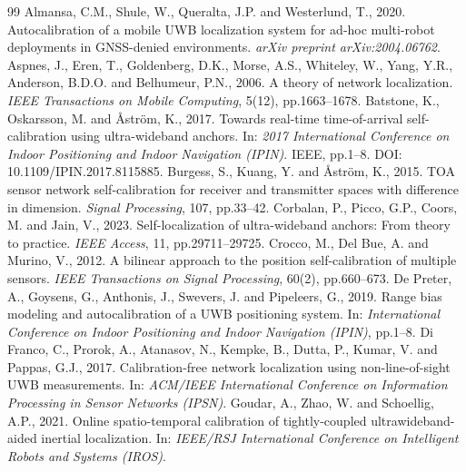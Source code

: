 \documentclass[11pt,a4paper]{article}
\begin{document}
\begin{thebibliography}{99}
 Almansa, C.M., Shule, W., Queralta, J.P. and Westerlund, T., 2020. Autocalibration of a mobile UWB localization system for ad-hoc multi-robot deployments in GNSS-denied environments. \emph{arXiv preprint arXiv:2004.06762}.
 Aspnes, J., Eren, T., Goldenberg, D.K., Morse, A.S., Whiteley, W., Yang, Y.R., Anderson, B.D.O. and Belhumeur, P.N., 2006. A theory of network localization. \emph{IEEE Transactions on Mobile Computing}, 5(12), pp.1663--1678.
 Batstone, K., Oskarsson, M. and \AA{}str\"om, K., 2017. Towards real-time time-of-arrival self-calibration using ultra-wideband anchors. In: \emph{2017 International Conference on Indoor Positioning and Indoor Navigation (IPIN)}. IEEE, pp.1--8. DOI: 10.1109/IPIN.2017.8115885.
 Burgess, S., Kuang, Y. and \AA{}str\"om, K., 2015. TOA sensor network self-calibration for receiver and transmitter spaces with difference in dimension. \emph{Signal Processing}, 107, pp.33--42.
 Corbalan, P., Picco, G.P., Coors, M. and Jain, V., 2023. Self-localization of ultra-wideband anchors: From theory to practice. \emph{IEEE Access}, 11, pp.29711--29725.
 Crocco, M., Del Bue, A. and Murino, V., 2012. A bilinear approach to the position self-calibration of multiple sensors. \emph{IEEE Transactions on Signal Processing}, 60(2), pp.660--673.
 De Preter, A., Goysens, G., Anthonis, J., Swevers, J. and Pipeleers, G., 2019. Range bias modeling and autocalibration of a UWB positioning system. In: \emph{International Conference on Indoor Positioning and Indoor Navigation (IPIN)}, pp.1--8.
 Di Franco, C., Prorok, A., Atanasov, N., Kempke, B., Dutta, P., Kumar, V. and Pappas, G.J., 2017. Calibration-free network localization using non-line-of-sight UWB measurements. In: \emph{ACM/IEEE International Conference on Information Processing in Sensor Networks (IPSN)}.
 Goudar, A., Zhao, W. and Schoellig, A.P., 2021. Online spatio-temporal calibration of tightly-coupled ultrawideband-aided inertial localization. In: \emph{IEEE/RSJ International Conference on Intelligent Robots and Systems (IROS)}.

\end{thebibliography}
\end{document}

